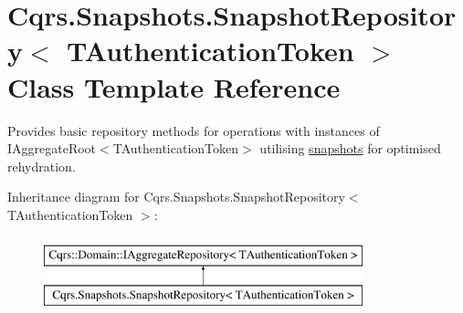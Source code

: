 \hypertarget{classCqrs_1_1Snapshots_1_1SnapshotRepository}{}\section{Cqrs.\+Snapshots.\+Snapshot\+Repository$<$ T\+Authentication\+Token $>$ Class Template Reference}
\label{classCqrs_1_1Snapshots_1_1SnapshotRepository}


Provides basic repository methods for operations with instances of I\+Aggregate\+Root$<$\+T\+Authentication\+Token$>$ utilising \hyperlink{classCqrs_1_1Snapshots_1_1Snapshot}{snapshots} for optimised rehydration.  


Inheritance diagram for Cqrs.\+Snapshots.\+Snapshot\+Repository$<$ T\+Authentication\+Token $>$\+:\begin{figure}[H]
\begin{center}
\leavevmode
\includegraphics[height=2.000000cm]{classCqrs_1_1Snapshots_1_1SnapshotRepository}
\end{center}
\end{figure}
